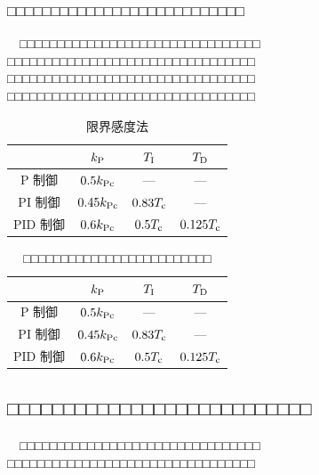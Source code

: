 \subsubsection{□□□□□□□□□□□□□□□□□□□□□□□□□□□}
　□□□□□□□□□□□□□□□□□□□□□□□□□□□□□□□□
□□□□□□□□□□□□□□□□□□□□□□□□□□□□□□□□□
□□□□□□□□□□□□□□□□□□□□□□□□□□□□□□□□□
□□□□□□□□□□□□□□□□□□□□□□□□□□□□□□□□□
\begin{table}[t!]
	\centering
	\medskip
	\caption{限界感度法}
	\label{table:pid}
	\smallskip
	\begin{tabular}{|c|c|c|c|}
		\hline
		& ${k}_{\rm P}$ & ${T}_{\rm I}$ & ${T}_{\rm D}$ \\\hline
		P 制御   & $0.5{k}_{\rm Pc}$  & --- & --- \\\hline
		PI 制御  & $0.45{k}_{\rm Pc}$ & $0.83{T}_{\rm c}$ & --- \\\hline
		PID 制御 & $0.6{k}_{\rm Pc}$  & $0.5{T}_{\rm c}$  & $0.125{T}_{\rm c}$ \\\hline
	\end{tabular}
	\medskip
\end{table}
\begin{table}[t!]
	\centering
	\medskip
	\caption{□□□□□□□□□□□□□□□□□□□□□□□□□}
	\label{table:pid2}
	\smallskip
	\begin{tabular}{|c|c|c|c|}
		\hline
		& ${k}_{\rm P}$ & ${T}_{\rm I}$ & ${T}_{\rm D}$ \\\hline
		P 制御   & $0.5{k}_{\rm Pc}$  & --- & --- \\\hline
		PI 制御  & $0.45{k}_{\rm Pc}$ & $0.83{T}_{\rm c}$ & --- \\\hline
		PID 制御 & $0.6{k}_{\rm Pc}$  & $0.5{T}_{\rm c}$  & $0.125{T}_{\rm c}$ \\\hline
	\end{tabular}
	\medskip
\end{table}


\subsection{□□□□□□□□□□□□□□□□□□□□□□□□□□□}
　□□□□□□□□□□□□□□□□□□□□□□□□□□□□□□□□
□□□□□□□□□□□□□□□□□□□□□□□□□□□□□□□□□

